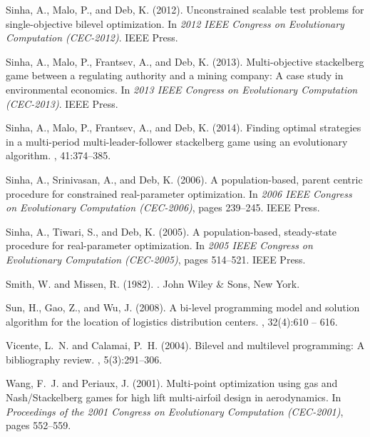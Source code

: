\documentclass[twoside]{article}
\begin{document}
\begin{thebibliography}{}
Sinha, A., Malo, P., and Deb, K. (2012).
\newblock Unconstrained scalable test problems for single-objective bilevel
  optimization.
\newblock In {\em 2012 IEEE Congress on Evolutionary Computation (CEC-2012)}.
  IEEE Press.

Sinha, A., Malo, P., Frantsev, A., and Deb, K. (2013).
\newblock Multi-objective stackelberg game between a regulating authority and a
  mining company: A case study in environmental economics.
\newblock In {\em 2013 IEEE Congress on Evolutionary Computation (CEC-2013)}.
  IEEE Press.

Sinha, A., Malo, P., Frantsev, A., and Deb, K. (2014).
\newblock Finding optimal strategies in a multi-period multi-leader-follower
  stackelberg game using an evolutionary algorithm.
, 41:374--385.

Sinha, A., Srinivasan, A., and Deb, K. (2006).
\newblock A population-based, parent centric procedure for constrained
  real-parameter optimization.
\newblock In {\em 2006 IEEE Congress on Evolutionary Computation (CEC-2006)},
  pages 239--245. IEEE Press.

Sinha, A., Tiwari, S., and Deb, K. (2005).
\newblock A population-based, steady-state procedure for real-parameter
  optimization.
\newblock In {\em 2005 IEEE Congress on Evolutionary Computation (CEC-2005)},
  pages 514--521. IEEE Press.

Smith, W. and Missen, R. (1982).
.
\newblock John Wiley \& Sons, New York.

Sun, H., Gao, Z., and Wu, J. (2008).
\newblock A bi-level programming model and solution algorithm for the location
  of logistics distribution centers.
, 32(4):610 -- 616.

Vicente, L.~N. and Calamai, P.~H. (2004).
\newblock Bilevel and multilevel programming: {A} bibliography review.
, 5(3):291--306.

Wang, F.~J. and Periaux, J. (2001).
\newblock Multi-point optimization using gas and {Nash/Stackelberg} games for
  high lift multi-airfoil design in aerodynamics.
\newblock In {\em Proceedings of the 2001 Congress on Evolutionary Computation
  (CEC-2001)}, pages 552--559.


\end{thebibliography}
\end{document}
